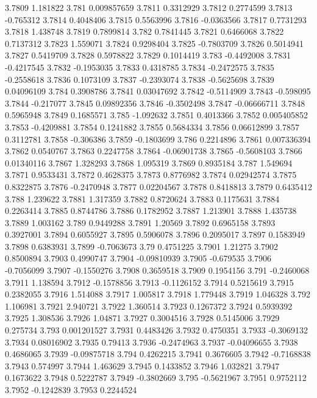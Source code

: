 3.7809  1.181822
3.781  0.009857659
3.7811  0.3312929
3.7812  0.2774599
3.7813  -0.765312
3.7814  0.4048406
3.7815  0.5563996
3.7816  -0.0363566
3.7817  0.7731293
3.7818  1.438748
3.7819  0.7899814
3.782  0.7841445
3.7821  0.6466068
3.7822  0.7137312
3.7823  1.559071
3.7824  0.9298404
3.7825  -0.7803709
3.7826  0.5014941
3.7827  0.5419709
3.7828  0.5978822
3.7829  0.1014419
3.783  -0.4492008
3.7831  -0.4217545
3.7832  -0.1953035
3.7833  0.4318785
3.7834  -0.2472575
3.7835  -0.2558618
3.7836  0.1073109
3.7837  -0.2393074
3.7838  -0.5625698
3.7839  0.04096109
3.784  0.3908786
3.7841  0.03047692
3.7842  -0.5114909
3.7843  -0.598095
3.7844  -0.217077
3.7845  0.09892356
3.7846  -0.3502498
3.7847  -0.06666711
3.7848  0.5965948
3.7849  0.1685571
3.785  -1.092632
3.7851  0.4013366
3.7852  0.005405852
3.7853  -0.4209881
3.7854  0.1241882
3.7855  0.5684334
3.7856  0.06612899
3.7857  0.3112781
3.7858  -0.306386
3.7859  -0.1803699
3.786  0.2214896
3.7861  0.007336394
3.7862  0.0540767
3.7863  0.2247758
3.7864  -0.06901738
3.7865  -0.5608103
3.7866  0.01340116
3.7867  1.328293
3.7868  1.095319
3.7869  0.8935184
3.787  1.549694
3.7871  0.9533431
3.7872  0.4628375
3.7873  0.8776982
3.7874  0.02942574
3.7875  0.8322875
3.7876  -0.2470948
3.7877  0.02204567
3.7878  0.8418813
3.7879  0.6435412
3.788  1.239622
3.7881  1.317359
3.7882  0.8720624
3.7883  0.1175631
3.7884  0.2263414
3.7885  0.8744786
3.7886  0.1782952
3.7887  1.213901
3.7888  1.435738
3.7889  1.003162
3.789  0.9449288
3.7891  1.20569
3.7892  0.6965158
3.7893  0.3927001
3.7894  0.6055927
3.7895  0.5906078
3.7896  0.2095017
3.7897  0.1583949
3.7898  0.6383931
3.7899  -0.7063673
3.79  0.4751225
3.7901  1.21275
3.7902  0.8500894
3.7903  0.4990747
3.7904  -0.09810939
3.7905  -0.679535
3.7906  -0.7056099
3.7907  -0.1550276
3.7908  0.3659518
3.7909  0.1954156
3.791  -0.2460068
3.7911  1.138594
3.7912  -0.1578856
3.7913  -0.1126152
3.7914  0.5215619
3.7915  0.2382055
3.7916  1.514088
3.7917  1.005817
3.7918  1.779448
3.7919  1.046328
3.792  1.106981
3.7921  2.940721
3.7922  1.360514
3.7923  0.1267372
3.7924  0.5939392
3.7925  1.308536
3.7926  1.04871
3.7927  0.3004516
3.7928  0.5145006
3.7929  0.275734
3.793  0.001201527
3.7931  0.4483426
3.7932  0.4750351
3.7933  -0.3069132
3.7934  0.08016902
3.7935  0.79413
3.7936  -0.2474963
3.7937  -0.04096655
3.7938  0.4686065
3.7939  -0.09875718
3.794  0.4262215
3.7941  0.3676605
3.7942  -0.7168838
3.7943  0.574997
3.7944  1.463629
3.7945  0.1433852
3.7946  1.032821
3.7947  0.1673622
3.7948  0.5222787
3.7949  -0.3802669
3.795  -0.5621967
3.7951  0.9752112
3.7952  -0.1242839
3.7953  0.2244524
